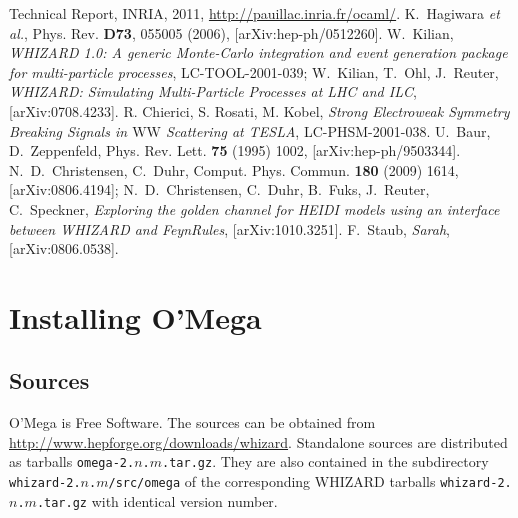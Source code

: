 \documentclass[12pt,a4paper]{article}
\begin{document}
\begin{thebibliography}{10}
    Technical Report, INRIA, 2011,
    \url{http://pauillac.inria.fr/ocaml/}.
    K.~Hagiwara \textit{et al.},
    Phys.{} Rev.{} \textbf{D73}, 055005 (2006),
    [arXiv:hep-ph/0512260].
    W.~Kilian,
    \textit{WHIZARD 1.0: A generic Monte-Carlo integration and event
      generation package for multi-particle processes},
    LC-TOOL-2001-039;
    W.~Kilian, T.~Ohl, J.~Reuter,
    \textit{WHIZARD: Simulating Multi-Particle Processes at LHC and ILC},
    [arXiv:0708.4233].
    R. Chierici, S. Rosati, M. Kobel,
    \textit{Strong Electroweak Symmetry Breaking Signals in
      $\mathrm{WW}$ Scattering at TESLA},
    LC-PHSM-2001-038.
    U.~Baur, D.~Zeppenfeld,
    Phys.{} Rev.{} Lett.{}  \textbf{75} (1995)  1002,
    [arXiv:hep-ph/9503344].
    N.~D.~Christensen, C.~Duhr,
    Comput.{} Phys.{} Commun.{} \textbf{180} (2009) 1614,
    [arXiv:0806.4194];
    N.~D.~Christensen, C.~Duhr, B.~Fuks, J.~Reuter, C.~Speckner,
    \textit{Exploring the golden channel for HEIDI models using an
      interface between WHIZARD and FeynRules},
    [arXiv:1010.3251].
    F.~Staub,
    \textit{Sarah},
    [arXiv:0806.0538].
\end{thebibliography}
\appendix
\section{Installing O'Mega}
\label{sec:installation}
\subsection{Sources}
O'Mega is Free Software.  The sources can be obtained from
\url{http://www.hepforge.org/downloads/whizard}.  Standalone sources
are distributed as tarballs
\texttt{omega-2.}$n$\texttt{.}$m$\texttt{.tar.gz}.  They are also
contained in the subdirectory
\texttt{whizard-2.}$n$\texttt{.}$m$\texttt{/src/omega} of the
corresponding WHIZARD tarballs
\texttt{whizard-2.}$n$\texttt{.}$m$\texttt{.tar.gz} with identical
version number.
\end{document}
